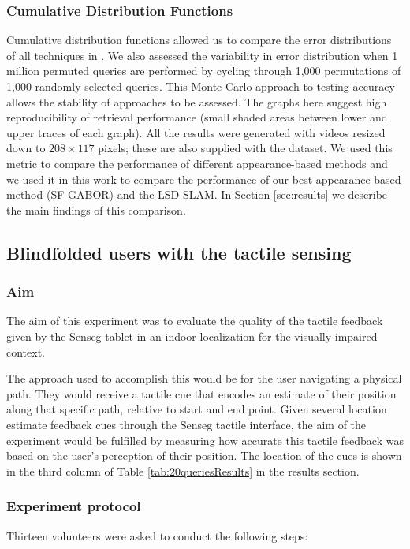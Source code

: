 \subsubsection{Cumulative Distribution Functions}
Cumulative distribution functions allowed us to compare the error distributions of all techniques in \citep{Rivera-Rubio2015PRL}.  We also assessed the variability in error distribution when 1 million permuted queries are performed by cycling through 1,000 permutations of 1,000 randomly selected queries.  This Monte-Carlo approach to testing accuracy allows the stability of approaches to be assessed. The graphs here suggest high reproducibility of retrieval performance (small shaded areas between lower and upper traces of each graph).  All the results were generated with videos resized down to $208 \times 117$ pixels; these are also supplied with the dataset. We used this metric to compare the performance of different appearance-based methods and we used it in this work to compare the performance of our best appearance-based method (SF-GABOR) and the LSD-SLAM. In Section \ref{sec:results} we describe the main findings of this comparison.

\subsection{Blindfolded users with the tactile sensing}
\subsubsection{Aim}
The aim of this experiment was to evaluate the quality of the tactile feedback given by the Senseg tablet in an indoor localization for the visually impaired context. 

The approach used to accomplish this would be for the user navigating a physical path. They would receive a tactile cue that encodes an estimate of their position along that specific path, relative to start and end point. Given several location estimate feedback cues through the Senseg tactile interface, the aim of the experiment would be fulfilled by measuring how accurate this tactile feedback was based on the user's perception of their position. The location of the cues is shown in the third column of Table \ref{tab:20queriesResults} in the results section.

\subsubsection{Experiment protocol}
Thirteen volunteers were asked to conduct the following steps:

